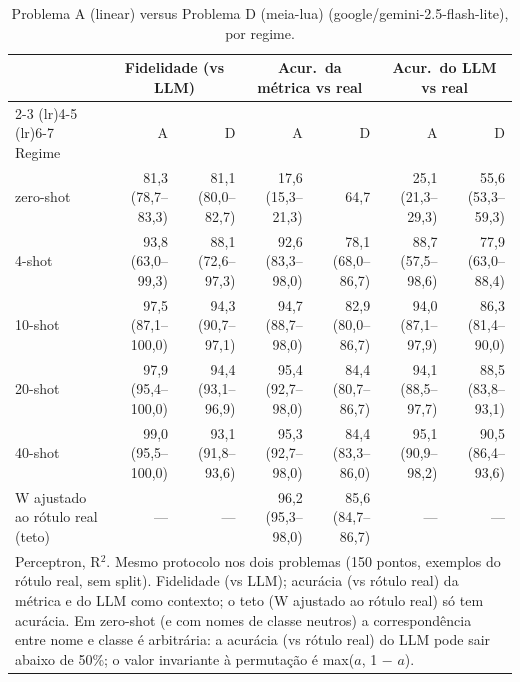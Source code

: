\begin{table}[htbp]
\centering
\small
\caption{Problema A (linear) versus Problema D (meia-lua) (google/gemini-2.5-flash-lite), por regime.}
\label{tab:bloco1_A_vs_D_por_regime_flashlite}
\begin{tabular}{lrrrrrr}
\toprule
 & \multicolumn{2}{c}{Fidelidade (vs LLM)} & \multicolumn{2}{c}{Acur.\ da métrica vs real} & \multicolumn{2}{c}{Acur.\ do LLM vs real} \\ \cmidrule(lr){2-3} \cmidrule(lr){4-5} \cmidrule(lr){6-7}
Regime & A & D & A & D & A & D \\
\midrule
zero-shot & 81,3 (78,7–83,3) & 81,1 (80,0–82,7) & 17,6 (15,3–21,3) & 64,7 & 25,1 (21,3–29,3) & 55,6 (53,3–59,3) \\
4-shot & 93,8 (63,0–99,3) & 88,1 (72,6–97,3) & 92,6 (83,3–98,0) & 78,1 (68,0–86,7) & 88,7 (57,5–98,6) & 77,9 (63,0–88,4) \\
10-shot & 97,5 (87,1–100,0) & 94,3 (90,7–97,1) & 94,7 (88,7–98,0) & 82,9 (80,0–86,7) & 94,0 (87,1–97,9) & 86,3 (81,4–90,0) \\
20-shot & 97,9 (95,4–100,0) & 94,4 (93,1–96,9) & 95,4 (92,7–98,0) & 84,4 (80,7–86,7) & 94,1 (88,5–97,7) & 88,5 (83,8–93,1) \\
40-shot & 99,0 (95,5–100,0) & 93,1 (91,8–93,6) & 95,3 (92,7–98,0) & 84,4 (83,3–86,0) & 95,1 (90,9–98,2) & 90,5 (86,4–93,6) \\
\midrule
W ajustado ao rótulo real (teto) & — & — & 96,2 (95,3–98,0) & 85,6 (84,7–86,7) & — & — \\
\bottomrule
\multicolumn{7}{p{0.95\linewidth}}{\footnotesize Perceptron, R$^2$. Mesmo protocolo nos dois problemas (150 pontos, exemplos do rótulo real, sem split). Fidelidade (vs LLM); acurácia (vs rótulo real) da métrica e do LLM como contexto; o teto (W ajustado ao rótulo real) só tem acurácia. Em zero-shot (e com nomes de classe neutros) a correspondência entre nome e classe é arbitrária: a acurácia (vs rótulo real) do LLM pode sair abaixo de 50\%; o valor invariante à permutação é max($a$, 1 $-$ $a$).} \\
\end{tabular}
\end{table}
